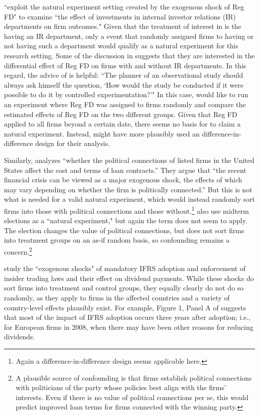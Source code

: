 \documentclass[11pt,reqno,titlepage]{amsart}
\begin{document}
\begin{doublespace}
\citet{Kirk:2014gx} ``exploit the natural experiment setting created by the exogenous shock of Reg FD" to examine ``the effect of investments in internal investor relations (IR) departments on firm outcomes."
Given that the treatment of interest in \citet{Kirk:2014gx} is the having an IR department, only a event that randomly assigned firms to having or not having such a department would qualify as a natural experiment for this research setting.
Some of the discussion in \citet{Kirk:2014gx} suggests that they are interested in the differential effect of Reg FD on firms with and without IR departments.
In this regard, the advice of \citet[p.\,236]{Cochran:1965if} is helpful: ``The planner of an observational study should always ask himself the question, `How would the study be conducted if it were possible to do it by controlled experimentation?'"
In this case, \citet{Kirk:2014gx} would like to run an experiment where Reg FD was assigned to firms randomly and compare the estimated effects of Reg FD on the two different groups.
Given that Reg FD applied to all firms beyond a certain date, there seems no basis for \citet{Kirk:2014gx} to claim a natural experiment.
Instead, \citet{Kirk:2014gx} might have more plausibly used an difference-in-difference design for their analysis.

Similarly, \citet{Houston:2014hv} analyzes ``whether the political connections of listed firms in the United States affect the cost and terms of loan contracts.'' 
They argue that ``the recent financial crisis can be viewed as a major exogenous shock, the effects of which may vary depending on whether the firm is politically connected.'' 
But this is not what is needed for a valid natural experiment, which would instead randomly sort firms into those with political connections and those without.\footnote{
Again a difference-in-difference design seems applicable here.}
 \citet{Houston:2014hv} also use midterm elections as a ``natural experiment," but again the term does not seem to apply.
 The election changes the value of political connections, but does not sort firms into treatment groups on an as-if random basis, so confounding remains a concern.\footnote{A plausible source of confounding is that firms establish political connections with politicians of the party whose policies best align with the firms' interests.
 Even if there is no value of political connections per se, this would predict improved loan terms for firms connected with the winning party.} 

\citet{Hail:2014fq} study the ``exogenous shocks" of mandatory IFRS adoption and enforcement of insider trading laws and their effect on dividend payments.
While these shocks do sort firms into treatment and control groups, they equally clearly do not do so randomly, as they apply to firms in the affected countries and a variety of country-level effects plausibly exist. 
For example, Figure 1, Panel A of \citet{Hail:2014fq} suggests that most of the impact of IFRS adoption occurs three years after adoption; i.e., for European firms in 2008, when there may have been other reasons for reducing dividends.


\end{doublespace}
\end{document}
